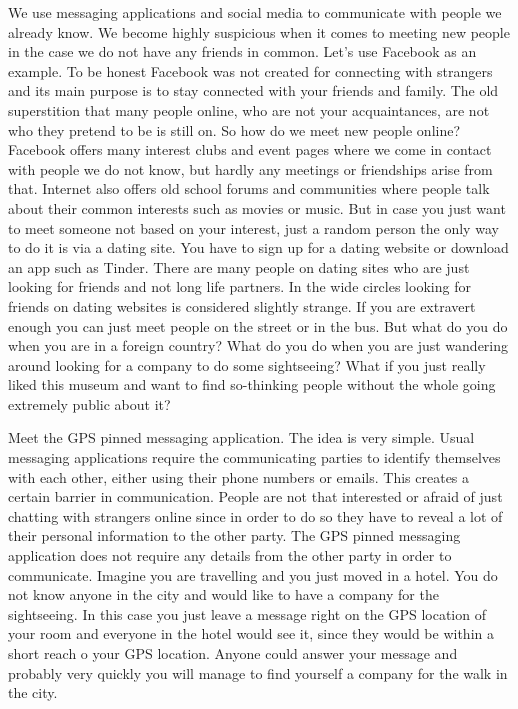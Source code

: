 \documentclass[thesis=M,english]{FITthesis}[2012/10/20]
\begin{document}
We use messaging applications and social media to communicate with people we already know. We become highly suspicious when it comes to meeting new people in the case we do not have any friends in common. Let's use Facebook as an example. To be honest Facebook was not created for connecting with strangers and its main purpose is to stay connected with your friends and family. The old superstition that many people online, who are not your acquaintances, are not who they pretend to be is still on. So how do we meet new people online? Facebook offers many interest clubs and event pages where we come in contact with people we do not know, but hardly any meetings or friendships arise from that. Internet also offers old school forums and communities where people talk about their common interests such as movies or music. But in case you just want to meet someone not based on your interest, just a random person the only way to do it is via a dating site. You have to sign up for a dating website or download an app such as Tinder. There are many people on dating sites who are just looking for friends and not long life partners. In the wide circles looking for friends on dating websites is considered slightly strange. If you are extravert enough you can just meet people on the street or in the bus. But what do you do when you are in a foreign country? What do you do when you are just wandering around looking for a company to do some sightseeing? What if you just really liked this museum and want to find so-thinking people without the whole going extremely public about it?

Meet the GPS pinned messaging application. The idea is very simple. Usual messaging applications require the communicating parties to identify themselves with each other, either using their phone numbers or emails. This creates a certain barrier in communication. People are not that interested or afraid of just chatting with strangers online since in order to do so they have to reveal a lot of their personal information to the other party. The GPS pinned messaging application does not require any details from the other party in order to communicate. Imagine you are travelling and you just moved in a hotel. You do not know anyone in the city and would like to have a company for the sightseeing. In this case you just leave a message right on the GPS location of your room and everyone in the hotel would see it, since they would be within a short reach o your GPS location. Anyone could answer your message and probably very quickly you will manage to find yourself a company for the walk in the city.
\end{document}
